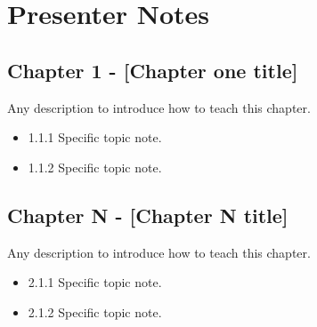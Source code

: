 \documentclass[../workbook]{subfiles}
\begin{document}

\section*{Presenter Notes}


\subsection*{Chapter 1 - [Chapter one title]}

\par{
    Any description to introduce how to teach this chapter.
}


\begin{itemize}
    \item 1.1.1 Specific topic note.
    \item 1.1.2 Specific topic note.
\end{itemize}


\subsection*{Chapter N - [Chapter N title]}

\par{
    Any description to introduce how to teach this chapter.
}


\begin{itemize}
    \item 2.1.1 Specific topic note.
    \item 2.1.2 Specific topic note.
\end{itemize}
\end{document}
